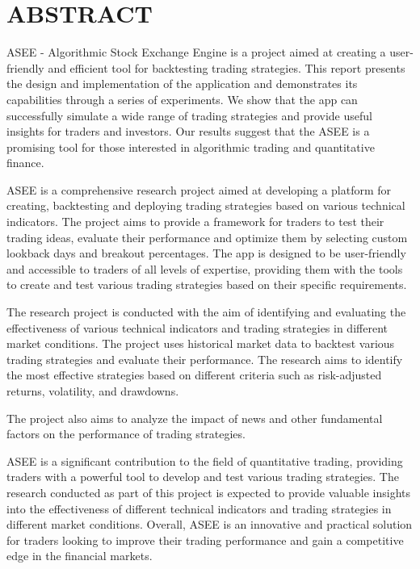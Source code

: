 \chapter*{ABSTRACT}

ASEE - Algorithmic Stock Exchange Engine is a project aimed at creating a user-friendly and efficient tool for backtesting trading strategies. This report presents the design and implementation of the application and demonstrates its capabilities through a series of experiments. We show that the app can successfully simulate a wide range of trading strategies and provide useful insights for traders and investors. Our results suggest that the ASEE is a promising tool for those interested in algorithmic trading and quantitative finance.

ASEE is a comprehensive research project aimed at developing a platform for creating, backtesting and deploying trading strategies based on various technical indicators. The project aims to provide a framework for traders to test their trading ideas, evaluate their performance and optimize them by selecting custom lookback days and  breakout percentages. The app is designed to be user-friendly and accessible to traders of all levels of expertise, providing them with the tools to create and test various trading strategies based on their specific requirements.

The research project is conducted with the aim of identifying and evaluating the effectiveness of various technical indicators and trading strategies in different market conditions. The project uses historical market data to backtest various trading strategies and evaluate their performance. The research aims to identify the most effective strategies based on different criteria such as risk-adjusted returns, volatility, and drawdowns.

The project also aims to analyze the impact of news and other fundamental factors on the performance of trading strategies.

ASEE is a significant contribution to the field of quantitative trading, providing traders with a powerful tool to develop and test various trading strategies. The research conducted as part of this project is expected to provide valuable insights into the effectiveness of different technical indicators and trading strategies in different market conditions. Overall, ASEE is an innovative and practical solution for traders looking to improve their trading performance and gain a competitive edge in the financial markets.

\cleardoublepage
